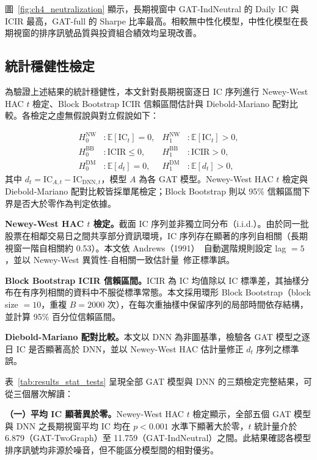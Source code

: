 圖~\ref{fig:ch4_neutralization} 顯示，長期視窗中 GAT-IndNeutral 的 Daily IC 與 ICIR 最高，GAT-full 的 Sharpe 比率最高。相較無中性化模型，中性化模型在長期視窗的排序訊號品質與投資組合績效均呈現改善。

\subsection{統計穩健性檢定}
\label{subsec:statistical_tests}

為驗證上述結果的統計穩健性，本文針對長期視窗逐日 IC 序列進行 Newey-West HAC $t$ 檢定、Block Bootstrap ICIR 信賴區間估計與 Diebold-Mariano 配對比較。各檢定之虛無假說與對立假說如下：

\begin{align}
H_0^{\mathrm{NW}} &: \mathbb{E}[\mathrm{IC}_t] = 0,
&
H_1^{\mathrm{NW}} &: \mathbb{E}[\mathrm{IC}_t] > 0, \\
H_0^{\mathrm{BB}} &: \mathrm{ICIR} \leq 0,
&
H_1^{\mathrm{BB}} &: \mathrm{ICIR} > 0, \\
H_0^{\mathrm{DM}} &: \mathbb{E}[d_t] = 0,
&
H_1^{\mathrm{DM}} &: \mathbb{E}[d_t] > 0,
\end{align}
其中 $d_t=\mathrm{IC}_{A,t}-\mathrm{IC}_{\mathrm{DNN},t}$，模型 $A$ 為各 GAT 模型。Newey-West HAC $t$ 檢定與 Diebold-Mariano 配對比較皆採單尾檢定；Block Bootstrap 則以 95\% 信賴區間下界是否大於零作為判定依據。

\textbf{Newey-West HAC $t$ 檢定。}截面 IC 序列並非獨立同分布（i.i.d.）。由於同一批股票在相鄰交易日之間共享部分資訊環境，IC 序列存在顯著的序列自相關（長期視窗一階自相關約 0.53）。本文依 Andrews（1991）~\cite{andrews1991autocovariance}自動選階規則設定 lag $= 5$，並以 Newey-West 異質性-自相關一致估計量~\cite{newey1987simple}修正標準誤。

\textbf{Block Bootstrap ICIR 信賴區間。}ICIR 為 IC 均值除以 IC 標準差，其抽樣分布在有序列相關的資料中不服從標準常態。本文採用環形 Block Bootstrap（block size $= 10$，重複 $B = 2000$ 次），在每次重抽樣中保留序列的局部時間依存結構，並計算 95\% 百分位信賴區間。

\textbf{Diebold-Mariano 配對比較。}本文以 DNN 為非圖基準，檢驗各 GAT 模型之逐日 IC 是否顯著高於 DNN，並以 Newey-West HAC 估計量修正 $d_t$ 序列之標準誤。



表~\ref{tab:results_stat_tests} 呈現全部 GAT 模型與 DNN 的三類檢定完整結果，可從三個層次解讀：

\textbf{（一）平均 IC 顯著異於零。}Newey-West HAC $t$ 檢定顯示，全部五個 GAT 模型與 DNN 之長期視窗平均 IC 均在 $p < 0.001$ 水準下顯著大於零，$t$ 統計量介於 6.879（GAT-TwoGraph）至 11.759（GAT-IndNeutral）之間。此結果確認各模型排序訊號均非源於噪音，但不能區分模型間的相對優劣。

